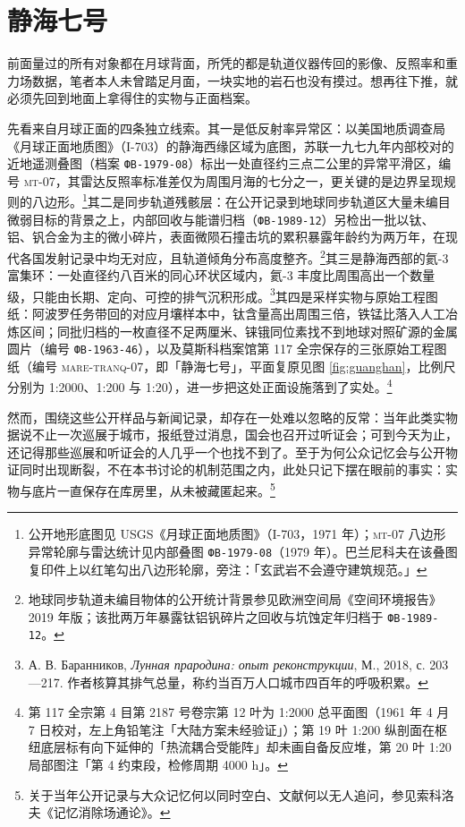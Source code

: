 \section{静海七号}

前面量过的所有对象都在月球背面，所凭的都是轨道仪器传回的影像、反照率和重力场数据，笔者本人未曾踏足月面，一块实地的岩石也没有摸过。想再往下推，就必须先回到地面上拿得住的实物与正面档案。

先看来自月球正面的四条独立线索。其一是低反射率异常区：以美国地质调查局《月球正面地质图》（I-703）的静海西缘区域为底图，苏联一九七九年内部校对的近地遥测叠图（档案 \texttt{ФВ-1979-08}）标出一处直径约三点二公里的异常平滑区，编号 \textsc{mt}-07，其雷达反照率标准差仅为周围月海的七分之一，更关键的是边界呈现规则的八边形。\footnote{公开地形底图见 USGS《月球正面地质图》（I-703，1971 年）；\textsc{mt}-07 八边形异常轮廓与雷达统计见内部叠图 \texttt{ФВ-1979-08}（1979 年）。巴兰尼科夫在该叠图复印件上以红笔勾出八边形轮廓，旁注：「玄武岩不会遵守建筑规范。」}其二是同步轨道残骸层：在公开记录到地球同步轨道区大量未编目微弱目标的背景之上，内部回收与能谱归档（\texttt{ФВ-1989-12}）另检出一批以钛、铝、钒合金为主的微小碎片，表面微陨石撞击坑的累积暴露年龄约为两万年，在现代各国发射记录中均无对应，且轨道倾角分布高度整齐。\footnote{地球同步轨道未编目物体的公开统计背景参见欧洲空间局《空间环境报告》2019 年版；该批两万年暴露钛铝钒碎片之回收与坑蚀定年归档于 \texttt{ФВ-1989-12}。}其三是静海西部的氦-3 富集环：一处直径约八百米的同心环状区域内，氦-3 丰度比周围高出一个数量级，只能由长期、定向、可控的排气沉积形成。\footnote{А. В. Баранников, \textit{Лунная прародина: опыт реконструкции}, М., 2018, с. 203—217. 作者核算其排气总量，称约当百万人口城市四百年的呼吸积累。}其四是采样实物与原始工程图纸：阿波罗任务带回的对应月壤样本中，钛含量高出周围三倍，铁锰比落入人工冶炼区间；同批归档的一枚直径不足两厘米、铼锇同位素找不到地球对照矿源的金属圆片（编号 \texttt{ФВ-1963-46}），以及莫斯科档案馆第 117 全宗保存的三张原始工程图纸（编号 \textsc{mare-tranq-07}，即「静海七号」，平面复原见图 \ref{fig:guanghan}，比例尺分别为 1:2000、1:200 与 1:20），进一步把这处正面设施落到了实处。\footnote{第 117 全宗第 4 目第 2187 号卷宗第 12 叶为 1:2000 总平面图（1961 年 4 月 7 日校对，左上角铅笔注「大陆方案未经验证」）；第 19 叶 1:200 纵剖面在枢纽底层标有向下延伸的「热流耦合受能阵」却未画自备反应堆，第 20 叶 1:20 局部图注「第 4 约束段，检修周期 4000 h」。}

然而，围绕这些公开样品与新闻记录，却存在一处难以忽略的反常：当年此类实物据说不止一次巡展于城市，报纸登过消息，国会也召开过听证会；可到今天为止，还记得那些巡展和听证会的人几乎一个也找不到了。至于为何公众记忆会与公开物证同时出现断裂，不在本书讨论的机制范围之内，此处只记下摆在眼前的事实：实物与底片一直保存在库房里，从未被藏匿起来。\footnote{关于当年公开记录与大众记忆何以同时空白、文献何以无人追问，参见索科洛夫《记忆消除场通论》。}

